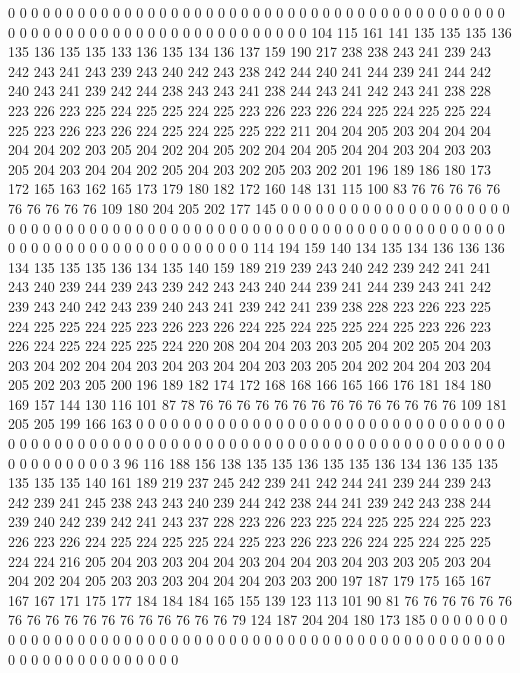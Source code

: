 0 0 0 0 0 0 0 0 0 0 0 0 0 0 0 0 0 0 0 0
0 0 0 0 0 0 0 0 0 0 0 0 0 0 0 0 0 0 0 0
0 0 0 0 0 0 0 0 0 0 0 0 0 0 0 0 0 0 0 0
0 0 0 0 0 0 0 0 0 104 115 161 141 135 135 135 136 135 136 135
135 133 136 135 134 136 137 159 190 217 238 238 243 241 239 243 242 243 241 243
239 243 240 242 243 238 242 244 240 241 244 239 241 244 242 240 243 241 239 242
244 238 243 243 241 238 244 243 241 242 243 241 238 228 223 226 223 225 224 225
225 224 225 223 226 223 226 224 225 224 225 225 224 225 223 226 223 226 224 225
224 225 225 222 211 204 204 205 203 204 204 204 204 204 202 203 205 204 202 204
205 202 204 204 205 204 204 203 204 203 203 205 204 203 204 204 202 205 204 203
202 205 203 202 201 196 189 186 180 173 172 165 163 162 165 173 179 180 182 172
160 148 131 115 100 83 76 76 76 76 76 76 76 76 76 76 109 180 204 205
202 177 145 0 0 0 0 0 0 0 0 0 0 0 0 0 0 0 0 0
0 0 0 0 0 0 0 0 0 0 0 0 0 0 0 0 0 0 0 0
0 0 0 0 0 0 0 0 0 0 0 0 0 0 0 0 0 0 0 0
0 0 0 0 0 0 0 0 0 0 0 0 0 0 0 0 0 0 0 0
0 0 0 0 0 0 0 114 194 159 140 134 135 134 136 136 136 134 135 135
135 136 134 135 140 159 189 219 239 243 240 242 239 242 241 241 243 240 239 244
239 243 239 242 243 243 240 244 239 241 244 239 243 241 242 239 243 240 242 243
239 240 243 241 239 242 241 239 238 228 223 226 223 225 224 225 225 224 225 223
226 223 226 224 225 224 225 225 224 225 223 226 223 226 224 225 224 225 225 224
220 208 204 204 203 203 205 204 202 205 204 203 203 204 202 204 204 203 204 203
204 204 203 203 205 204 202 204 204 203 204 205 202 203 205 200 196 189 182 174
172 168 168 166 165 166 176 181 184 180 169 157 144 130 116 101 87 78 76 76
76 76 76 76 76 76 76 76 76 76 76 76 109 181 205 205 199 166 163 0
0 0 0 0 0 0 0 0 0 0 0 0 0 0 0 0 0 0 0 0
0 0 0 0 0 0 0 0 0 0 0 0 0 0 0 0 0 0 0 0
0 0 0 0 0 0 0 0 0 0 0 0 0 0 0 0 0 0 0 0
0 0 0 0 0 0 0 0 0 0 0 0 0 0 0 0 0 0 0 0
0 0 0 3 96 116 188 156 138 135 135 136 135 135 136 134 136 135 135 135
135 135 140 161 189 219 237 245 242 239 241 242 244 241 239 244 239 243 242 239
241 245 238 243 243 240 239 244 242 238 244 241 239 242 243 238 244 239 240 242
239 242 241 243 237 228 223 226 223 225 224 225 225 224 225 223 226 223 226 224
225 224 225 225 224 225 223 226 223 226 224 225 224 225 225 224 224 216 205 204
203 203 204 204 203 204 204 203 204 203 203 205 203 204 204 202 204 205 203 203
203 204 204 204 203 203 200 197 187 179 175 165 167 167 167 171 175 177 184 184
184 165 155 139 123 113 101 90 81 76 76 76 76 76 76 76 76 76 76 76
76 76 76 76 76 76 76 79 124 187 204 204 180 173 185 0 0 0 0 0
0 0 0 0 0 0 0 0 0 0 0 0 0 0 0 0 0 0 0 0
0 0 0 0 0 0 0 0 0 0 0 0 0 0 0 0 0 0 0 0
0 0 0 0 0 0 0 0 0 0 0 0 0 0 0 0 0 0 0 0
